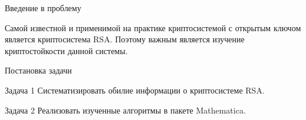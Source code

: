
\begin{frame}{Введение в проблему}
	\begin{center}
		Самой известной и применимой на практике криптосистемой с открытым ключом является криптосистема RSA. Поэтому важным является изучение криптостойкости данной системы.
	\end{center}
\end{frame}

\begin{frame}{Постановка задачи}	

	\begin{block}{Задача 1}
		Систематизировать обилие информации о криптосистеме RSA.	
	\end{block}	

	\begin{block}{Задача 2}
		Реализовать изученные алгоритмы в пакете Mathematica.
	\end{block}
		
\end{frame}